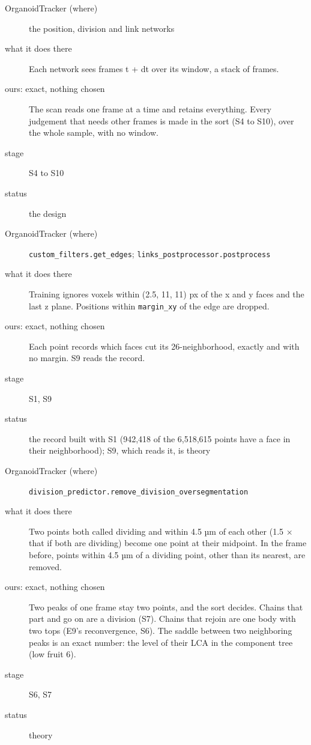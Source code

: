 \begin{description}
\item[{OrganoidTracker (where)}] the position, division and link networks
\item[{what it does there}] Each network sees frames t + dt over its window, a stack of frames.
\item[{ours: exact, nothing chosen}] The scan reads one frame at a time and retains everything. Every judgement that needs other frames is made in the sort (S4 to S10), over the whole sample, with no window.
\item[{stage}] S4 to S10
\item[{status}] the design
\end{description}

\begin{description}
\item[{OrganoidTracker (where)}] \texttt{custom\_\allowbreak{}filters.\allowbreak{}get\_\allowbreak{}edges}; \texttt{links\_\allowbreak{}postprocessor.\allowbreak{}postprocess}
\item[{what it does there}] Training ignores voxels within (2.5, 11, 11) px of the x and y faces and the last z plane. Positions within \texttt{margin\_\allowbreak{}xy} of the edge are dropped.
\item[{ours: exact, nothing chosen}] Each point records which faces cut its 26-neighborhood, exactly and with no margin. S9 reads the record.
\item[{stage}] S1, S9
\item[{status}] the record built with S1 (942,418 of the 6,518,615 points have a face in their neighborhood); S9, which reads it, is theory
\end{description}

\begin{description}
\item[{OrganoidTracker (where)}] \texttt{division\_\allowbreak{}predictor.\allowbreak{}remove\_\allowbreak{}division\_\allowbreak{}oversegmentation}
\item[{what it does there}] Two points both called dividing and within 4.5 µm of each other (1.5 × that if both are dividing) become one point at their midpoint. In the frame before, points within 4.5 µm of a dividing point, other than its nearest, are removed.
\item[{ours: exact, nothing chosen}] Two peaks of one frame stay two points, and the sort decides. Chains that part and go on are a division (S7). Chains that rejoin are one body with two tops (E9's reconvergence, S6). The saddle between two neighboring peaks is an exact number: the level of their LCA in the component tree (low fruit 6).
\item[{stage}] S6, S7
\item[{status}] theory
\end{description}

